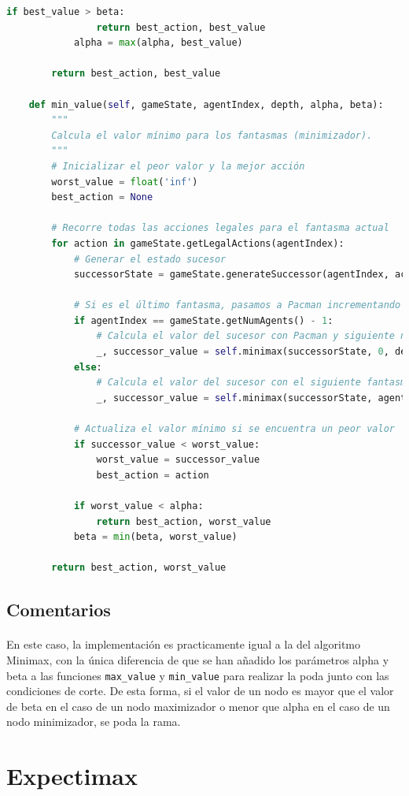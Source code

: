 \documentclass{report}
\begin{document}
\begin{lstlisting}[language=Python, caption=Implementación final del agente Alpha-Beta]
            if best_value > beta:
                return best_action, best_value
            alpha = max(alpha, best_value)

        return best_action, best_value

    def min_value(self, gameState, agentIndex, depth, alpha, beta):
        """
        Calcula el valor mínimo para los fantasmas (minimizador).
        """
        # Inicializar el peor valor y la mejor acción
        worst_value = float('inf')
        best_action = None

        # Recorre todas las acciones legales para el fantasma actual
        for action in gameState.getLegalActions(agentIndex):
            # Generar el estado sucesor
            successorState = gameState.generateSuccessor(agentIndex, action)
            
            # Si es el último fantasma, pasamos a Pacman incrementando la profundidad
            if agentIndex == gameState.getNumAgents() - 1:
                # Calcula el valor del sucesor con Pacman y siguiente nivel de profundidad
                _, successor_value = self.minimax(successorState, 0, depth + 1, alpha, beta)
            else:
                # Calcula el valor del sucesor con el siguiente fantasma
                _, successor_value = self.minimax(successorState, agentIndex + 1, depth, alpha, beta)

            # Actualiza el valor mínimo si se encuentra un peor valor
            if successor_value < worst_value:
                worst_value = successor_value
                best_action = action
                
            if worst_value < alpha:
                return best_action, worst_value
            beta = min(beta, worst_value)

        return best_action, worst_value
            \end{lstlisting}
        \subsection*{Comentarios}
          \paragraph*{}{
            En este caso, la implementación es practicamente igual a la del algoritmo Minimax, con la única diferencia de que se han añadido los parámetros alpha y beta a las funciones \texttt{max\_value} y \texttt{min\_value} para realizar la poda junto con las condiciones de corte.
            De esta forma, si el valor de un nodo es mayor que el valor de beta en el caso de un nodo maximizador o menor que alpha en el caso de un nodo minimizador, se poda la rama.
          }
      \clearpage\section{Expectimax}
\end{document}
